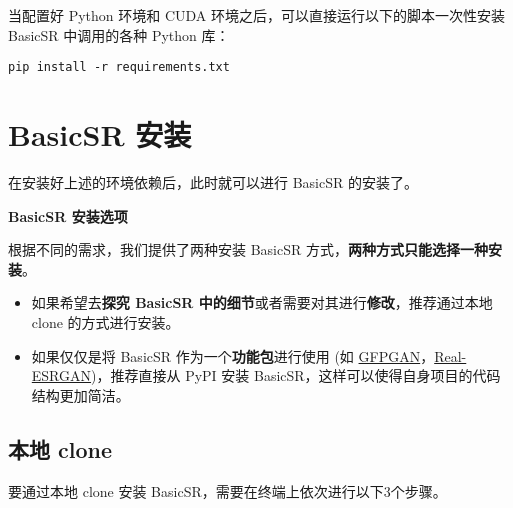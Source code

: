 \documentclass[../main.tex]{subfiles}
\begin{document}
当配置好 Python 环境和 CUDA 环境之后，可以直接运行以下的脚本一次性安装 BasicSR 中调用的各种 Python 库：

    \begin{verbatim}
pip install -r requirements.txt
    \end{verbatim}



\section{BasicSR 安装}
\label{section: install}
在安装好上述的环境依赖后，此时就可以进行 BasicSR 的安装了。

\begin{hl} %
	\textbf{BasicSR 安装选项}

	根据不同的需求，我们提供了两种安装 BasicSR 方式，\textbf{两种方式只能选择一种安装}。
	\begin{itemize}
		\item 如果希望去\textbf{探究 BasicSR 中的细节}或者需要对其进行\textbf{修改}，推荐通过本地 clone 的方式进行安装。
		\item 如果仅仅是将 BasicSR 作为一个\textbf{功能包}进行使用 (如 \href{https://github.com/TencentARC/GFPGAN}{GFPGAN}，\href{https://github.com/xinntao/Real-ESRGAN}{Real-ESRGAN})，推荐直接从 PyPI 安装 BasicSR，这样可以使得自身项目的代码结构更加简洁。
	\end{itemize}
\end{hl}

\subsection{本地 clone}
\label{subsection:pip-install}
要通过本地 clone 安装 BasicSR，需要在终端上依次进行以下3个步骤。
\end{document}
